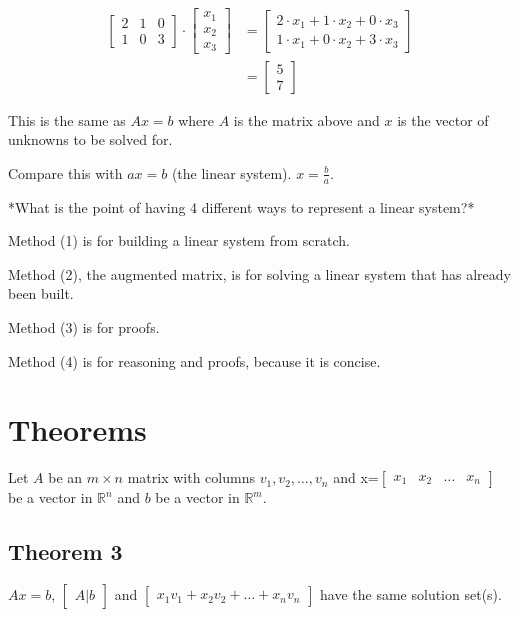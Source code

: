 \documentclass[12pt]{article}
\begin{document}
\begin{align*}
  \begin{bmatrix}
    2 & 1 & 0 \\
    1 & 0 & 3
  \end{bmatrix}
  \cdot
  \begin{bmatrix}
    x_1 \\ x_2 \\ x_3
  \end{bmatrix}
  &=
  \begin{bmatrix}
    2 \cdot x_1 + 1 \cdot x_2 + 0 \cdot x_3 \\
    1 \cdot x_1 + 0 \cdot x_2 + 3 \cdot x_3
  \end{bmatrix}\\
  &=
  \begin{bmatrix}
    5 \\ 7
  \end{bmatrix}
\end{align*}

This is the same as $Ax=b$ where $A$ is the matrix above and $x$ is the vector
of unknowns to be solved for.

Compare this with $ax=b$ (the linear system). $x=\frac{b}{a}$.

*What is the point of having 4 different ways to represent a linear system?*

Method (1) is for building a linear system from scratch.

Method (2), the augmented matrix, is for solving a linear system that has already
been built.

Method (3) is for proofs.

Method (4) is for reasoning and proofs, because it is concise.


\section{Theorems}

Let $A$ be an $m \times n$ matrix with columns $v_{1}, v_{2}, \dots, v_{n}$ and
x=$\begin{bmatrix} x_{1} & x_{2} & \dots & x_{n} \end{bmatrix}$ be a vector in
$\mathbb{R}^{n}$ and $b$ be a vector in $\mathbb{R}^{m}$.

\subsection{Theorem 3}

$Ax=b$, $\begin{bmatrix}A | b\end{bmatrix}$ and 
$\begin{bmatrix} x_1 v_1 + x_2 v_2 + \dots + x_n v_n \end{bmatrix}$ have the same
solution set(s).
\end{document}
